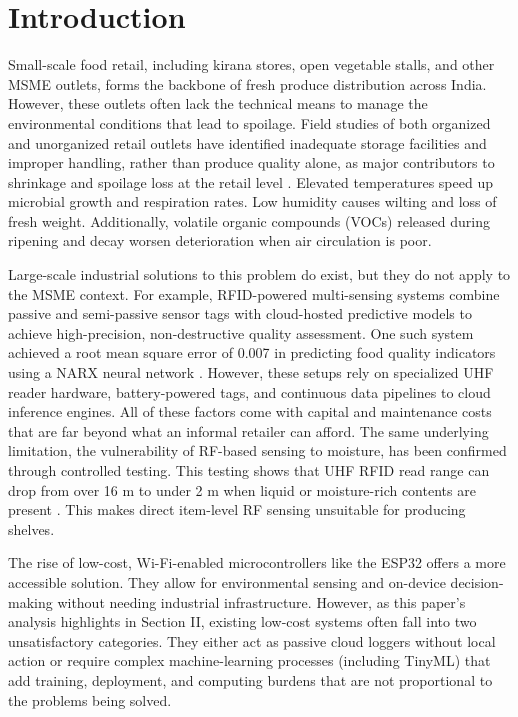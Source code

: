 \documentclass[conference]{IEEEtran}
\begin{document}
\section{Introduction}

Small-scale food retail, including kirana stores, open vegetable stalls, and other MSME outlets, forms the backbone of fresh produce distribution across India. However, these outlets often lack the technical means to manage the environmental conditions that lead to spoilage. Field studies of both organized and unorganized retail outlets have identified inadequate storage facilities and improper handling, rather than produce quality alone, as major contributors to shrinkage and spoilage loss at the retail level \cite{indumathi2020}. Elevated temperatures speed up microbial growth and respiration rates. Low humidity causes wilting and loss of fresh weight. Additionally, volatile organic compounds (VOCs) released during ripening and decay worsen deterioration when air circulation is poor.

Large-scale industrial solutions to this problem do exist, but they do not apply to the MSME context. For example, RFID-powered multi-sensing systems combine passive and semi-passive sensor tags with cloud-hosted predictive models to achieve high-precision, non-destructive quality assessment. One such system achieved a root mean square error of 0.007 in predicting food quality indicators using a NARX neural network \cite{song2024rfid}. However, these setups rely on specialized UHF reader hardware, battery-powered tags, and continuous data pipelines to cloud inference engines. All of these factors come with capital and maintenance costs that are far beyond what an informal retailer can afford. The same underlying limitation, the vulnerability of RF-based sensing to moisture, has been confirmed through controlled testing. This testing shows that UHF RFID read range can drop from over 16 m to under 2 m when liquid or moisture-rich contents are present \cite{claucherty2024}. This makes direct item-level RF sensing unsuitable for producing shelves.

The rise of low-cost, Wi-Fi-enabled microcontrollers like the ESP32 offers a more accessible solution. They allow for environmental sensing and on-device decision-making without needing industrial infrastructure. However, as this paper's analysis highlights in Section II, existing low-cost systems often fall into two unsatisfactory categories. They either act as passive cloud loggers without local action or require complex machine-learning processes (including TinyML) that add training, deployment, and computing burdens that are not proportional to the problems being solved.
\end{document}
